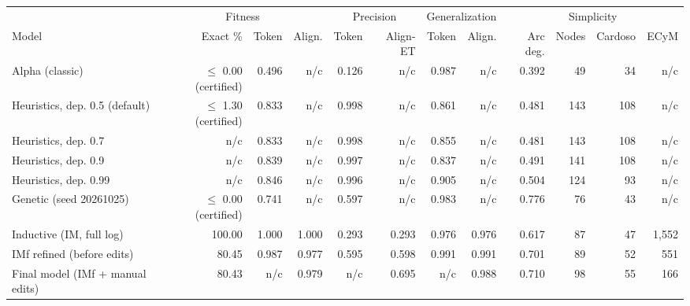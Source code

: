 \begin{tabular}{lrrrrrrrrrrr}
\hline
 & \multicolumn{3}{c}{Fitness} & \multicolumn{2}{c}{Precision} & \multicolumn{2}{c}{Generalization} & \multicolumn{4}{c}{Simplicity} \\
Model & Exact \% & Token & Align. & Token & Align-ET & Token & Align. & Arc deg. & Nodes & Cardoso & ECyM \\
\hline
Alpha (classic) & $\leq$ 0.00 (certified) & 0.496 & n/c & 0.126 & n/c & 0.987 & n/c & 0.392 & 49 & 34 & n/c \\
Heuristics, dep. 0.5 (default) & $\leq$ 1.30 (certified) & 0.833 & n/c & 0.998 & n/c & 0.861 & n/c & 0.481 & 143 & 108 & n/c \\
Heuristics, dep. 0.7 & n/c & 0.833 & n/c & 0.998 & n/c & 0.855 & n/c & 0.481 & 143 & 108 & n/c \\
Heuristics, dep. 0.9 & n/c & 0.839 & n/c & 0.997 & n/c & 0.837 & n/c & 0.491 & 141 & 108 & n/c \\
Heuristics, dep. 0.99 & n/c & 0.846 & n/c & 0.996 & n/c & 0.905 & n/c & 0.504 & 124 & 93 & n/c \\
Genetic (seed 20261025) & $\leq$ 0.00 (certified) & 0.741 & n/c & 0.597 & n/c & 0.983 & n/c & 0.776 & 76 & 43 & n/c \\
Inductive (IM, full log) & 100.00 & 1.000 & 1.000 & 0.293 & 0.293 & 0.976 & 0.976 & 0.617 & 87 & 47 & 1,552 \\
IMf refined (before edits) & 80.45 & 0.987 & 0.977 & 0.595 & 0.598 & 0.991 & 0.991 & 0.701 & 89 & 52 & 551 \\
Final model (IMf + manual edits) & 80.43 & n/c & 0.979 & n/c & 0.695 & n/c & 0.988 & 0.710 & 98 & 55 & 166 \\
\hline
\end{tabular}
